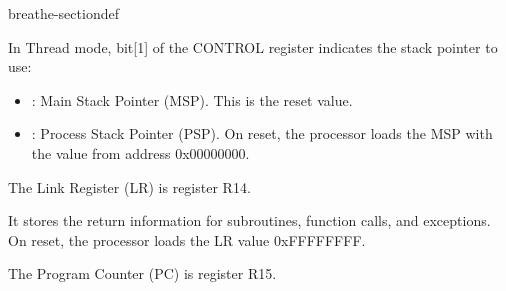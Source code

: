 \documentclass[letterpaper,10pt,english]{sphinxmanual}
\begin{document}
\begin{fulllineitems}
\begin{sphinxuseclass}{breathe-sectiondef}
\begin{fulllineitems}
\sphinxAtStartPar
In Thread mode, bit{[}1{]} of the CONTROL register indicates the stack pointer to use:\begin{itemize}
\item {} 
: Main Stack Pointer (MSP). This is the reset value.

\item {} 
: Process Stack Pointer (PSP). On reset, the processor loads the MSP with the value from address 0x00000000. 

\end{itemize}


\end{fulllineitems}


\begin{fulllineitems}
\label{\detokenize{source_code:_CPPv4N16coreRegistersDef13link_registerE}}\label{\detokenize{source_code:_CPPv3N16coreRegistersDef13link_registerE}}\label{\detokenize{source_code:_CPPv2N16coreRegistersDef13link_registerE}}\label{\detokenize{source_code:coreRegistersDef::link_register__uint32_t}}
\pysigstartsignatures
\pysigstartmultiline
{}
\pysigstopmultiline
\pysigstopsignatures
\sphinxAtStartPar
The Link Register (LR) is register R14. 

\sphinxAtStartPar
It stores the return information for subroutines, function calls, and exceptions. On reset, the processor loads the LR value 0xFFFFFFFF. 

\end{fulllineitems}


\begin{fulllineitems}
\label{\detokenize{source_code:_CPPv4N16coreRegistersDef15program_counterE}}\label{\detokenize{source_code:_CPPv3N16coreRegistersDef15program_counterE}}\label{\detokenize{source_code:_CPPv2N16coreRegistersDef15program_counterE}}\label{\detokenize{source_code:coreRegistersDef::program_counter__uint32_tP}}
\pysigstartsignatures
\pysigstartmultiline
{}
\pysigstopmultiline
\pysigstopsignatures
\sphinxAtStartPar
The Program Counter (PC) is register R15. 


\end{fulllineitems}
\end{sphinxuseclass}
\end{fulllineitems}
\end{document}
